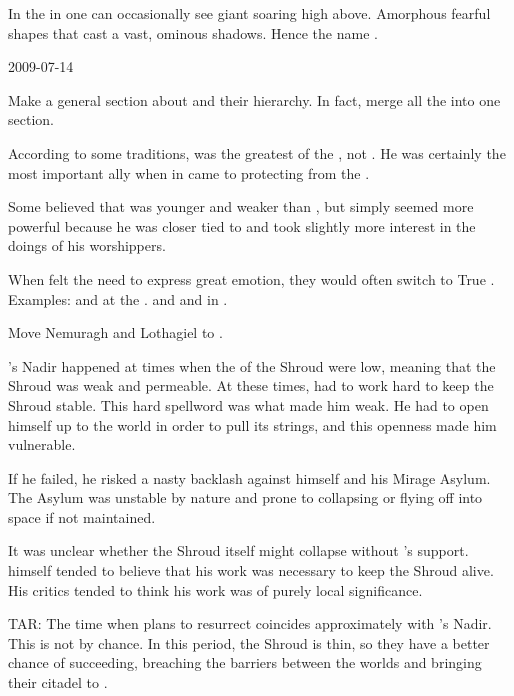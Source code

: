 In the \wylde in \Azmith one can occasionally see giant \umbrae soaring high above. 
Amorphous fearful shapes that cast a vast, ominous shadows.
Hence the name \quo{\umbra}. 



2009-07-14

Make a general section about \xss and their hierarchy. In fact, merge all the \xss into one section. 

According to some traditions, \NaathKurRamalech was the greatest of the \xss, not \RuinSatha.
He was certainly the \pps{\dragons} most important ally when in came to protecting \Miith from the \banes. 

Some believed that \NaathKurRamalech was younger and weaker than \RuinSatha, but simply seemed more powerful because he was closer tied to \Miith and took slightly more interest in the doings of his \Miithian worshippers. 



When \dragons felt the need to express great emotion, they would often switch to True \Draconic. 
Examples: 
  \Ishnaruchaefir and \Rystessakhin at the \Shrouding. 
  \Ishnaruchaefir and \Nzessuacrith and \Secherdamon in \TwilightAngelRemember.



Move Nemuragh and Lothagiel to \TiphredSerah. 



\Ishnaruchaefir's Nadir happened at times when the  of the Shroud were low, meaning that the Shroud was weak and permeable. 
At these times, \Ishnaruchaefir had to work hard to keep the Shroud stable. 
This hard spellword was what made him weak. 
He had to open himself up to the world in order to pull its strings, and this openness made him vulnerable. 

If he failed, he risked a nasty backlash against himself and his Mirage Asylum. 
The Asylum was unstable by nature and prone to collapsing or flying off into space if not maintained. 

It was unclear whether the Shroud itself might collapse without \Ishnaruchaefir's support. 
\Ishnaruchaefir himself tended to believe that his work was necessary to keep the Shroud alive.
His critics tended to think his work was of purely local significance. 

TAR: 
The time when \Secherdamon plans to resurrect \Nithdornazsh coincides approximately with \Ishnaruchaefir's Nadir.
This is not by chance. 
In this period, the Shroud is thin, so they have a better chance of succeeding, breaching the barriers between the worlds and bringing their citadel to \Azmith. 

